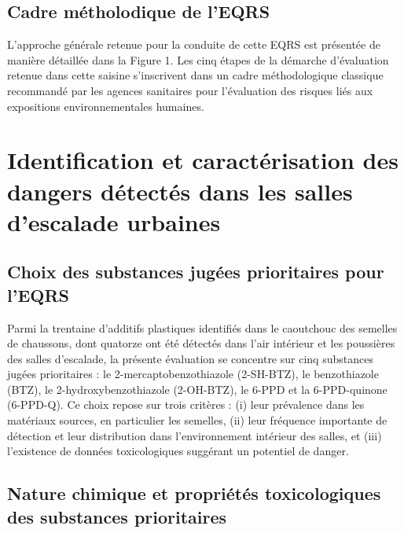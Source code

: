 \documentclass[pdflatex,sn-basic]{sn-jnl}%
\begin{document}
\subsection{Cadre métholodique de l'EQRS}
\label{subsec6}

L'approche générale retenue pour la conduite de cette EQRS est présentée de manière détaillée dans la Figure 1. Les cinq étapes de
la démarche d'évaluation retenue dans cette saisine s'inscrivent dans un cadre méthodologique classique recommandé par les agences sanitaires pour l'évaluation des risques liés aux expositions environnementales humaines.


\section{Identification et caractérisation des dangers détectés dans les salles d'escalade urbaines}
\label{sec3}

\subsection{Choix des substances jugées prioritaires pour l'EQRS}
\label{subsec7}

Parmi la trentaine d'additifs plastiques identifiés dans le caoutchouc des semelles de chaussons, dont quatorze ont été détectés dans l'air intérieur et les poussières des salles d'escalade, la présente évaluation se concentre sur cinq substances jugées prioritaires : le 2-mercaptobenzothiazole (2-SH-BTZ), le benzothiazole (BTZ), le 2-hydroxybenzothiazole (2-OH-BTZ), le 6-PPD et la 6-PPD-quinone (6-PPD-Q). Ce choix repose sur trois critères : (i) leur prévalence dans les matériaux sources, en particulier les semelles, (ii) leur fréquence importante de détection et leur distribution dans l'environnement intérieur des salles, et (iii) l'existence de données toxicologiques suggérant un potentiel de danger.

\subsection{Nature chimique et propriétés toxicologiques des substances prioritaires}
\label{subsec8}
\end{document}
